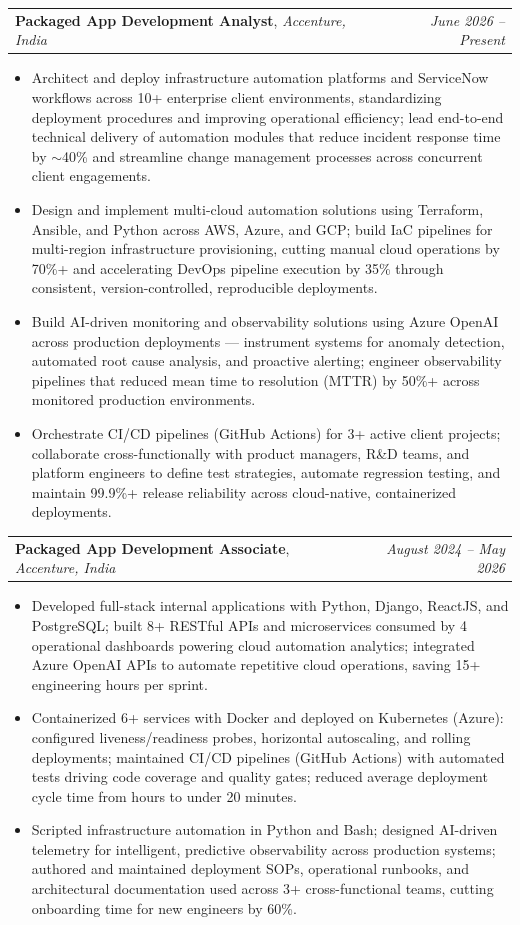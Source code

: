 \documentclass[letterpaper,11pt]{article}
\makeatletter
\newcommand{\resumeItem}[1]{
  \item\small{{#1 \vspace{-1pt}}}
}
\newcommand{\resumeSubheadingOneLine}[3]{
  \vspace{-1pt}\item
    \begin{tabular*}{0.97\textwidth}[t]{l@{\extracolsep{\fill}}r}
      \textbf{#1}, \textit{\small #2} & \textit{\small #3} \\
    \end{tabular*}\vspace{-6pt}
}
\newcommand{\resumeItemListStart}{\begin{itemize}}
\newcommand{\resumeItemListEnd}{\end{itemize}\vspace{-4pt}}
\makeatother
\begin{document}
    \resumeSubheadingOneLine
      {Packaged App Development Analyst}{Accenture, India}{June 2026 -- Present}
      \resumeItemListStart
        \resumeItem{Architect and deploy infrastructure automation platforms and ServiceNow workflows across 10+ enterprise client environments, standardizing deployment procedures and improving operational efficiency; lead end-to-end technical delivery of automation modules that reduce incident response time by $\sim$40\% and streamline change management processes across concurrent client engagements.}
        \resumeItem{Design and implement multi-cloud automation solutions using Terraform, Ansible, and Python across AWS, Azure, and GCP; build IaC pipelines for multi-region infrastructure provisioning, cutting manual cloud operations by 70\%+ and accelerating DevOps pipeline execution by 35\% through consistent, version-controlled, reproducible deployments.}
        \resumeItem{Build AI-driven monitoring and observability solutions using Azure OpenAI across production deployments — instrument systems for anomaly detection, automated root cause analysis, and proactive alerting; engineer observability pipelines that reduced mean time to resolution (MTTR) by 50\%+ across monitored production environments.}
        \resumeItem{Orchestrate CI/CD pipelines (GitHub Actions) for 3+ active client projects; collaborate cross-functionally with product managers, R\&D teams, and platform engineers to define test strategies, automate regression testing, and maintain 99.9\%+ release reliability across cloud-native, containerized deployments.}
      \resumeItemListEnd

    \resumeSubheadingOneLine
      {Packaged App Development Associate}{Accenture, India}{August 2024 -- May 2026}
      \resumeItemListStart
        \resumeItem{Developed full-stack internal applications with Python, Django, ReactJS, and PostgreSQL; built 8+ RESTful APIs and microservices consumed by 4 operational dashboards powering cloud automation analytics; integrated Azure OpenAI APIs to automate repetitive cloud operations, saving 15+ engineering hours per sprint.}
        \resumeItem{Containerized 6+ services with Docker and deployed on Kubernetes (Azure): configured liveness/readiness probes, horizontal autoscaling, and rolling deployments; maintained CI/CD pipelines (GitHub Actions) with automated tests driving code coverage and quality gates; reduced average deployment cycle time from hours to under 20 minutes.}
        \resumeItem{Scripted infrastructure automation in Python and Bash; designed AI-driven telemetry for intelligent, predictive observability across production systems; authored and maintained deployment SOPs, operational runbooks, and architectural documentation used across 3+ cross-functional teams, cutting onboarding time for new engineers by 60\%.}
      \resumeItemListEnd
\end{document}
